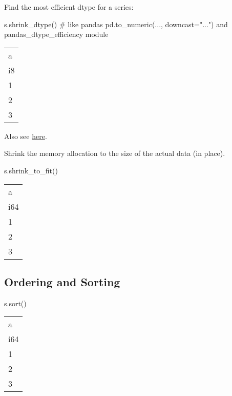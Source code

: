 \documentclass[
  letterpaper,
  DIV=11,
  numbers=noendperiod]{scrartcl}
\newenvironment{Shaded}{\begin{snugshade}}{\end{snugshade}}
\newcommand{\CommentTok}[1]{\textcolor[rgb]{0.37,0.37,0.37}{#1}}
\newcommand{\NormalTok}[1]{\textcolor[rgb]{0.00,0.23,0.31}{#1}}
\begin{document}
Find the most efficient dtype for a series:

\begin{Shaded}
\begin{Highlighting}[]
\NormalTok{s.shrink\_dtype() }\CommentTok{\# like pandas pd.to\_numeric(..., downcast="...") and pandas\_dtype\_efficiency module}
\end{Highlighting}
\end{Shaded}

\begin{longtable}[]{@{}l@{}}
\toprule()
a \\
i8 \\
\midrule()
\endhead
1 \\
2 \\
3 \\
\bottomrule()
\end{longtable}

Also see
\href{http://braaannigan.github.io/software/2022/10/31/polars-dtype-diet.html}{here}.

Shrink the memory allocation to the size of the actual data (in place).

\begin{Shaded}
\begin{Highlighting}[]
\NormalTok{s.shrink\_to\_fit() }
\end{Highlighting}
\end{Shaded}

\begin{longtable}[]{@{}l@{}}
\toprule()
a \\
i64 \\
\midrule()
\endhead
1 \\
2 \\
3 \\
\bottomrule()
\end{longtable}

\hypertarget{ordering-and-sorting}{%
\subsection{Ordering and Sorting}\label{ordering-and-sorting}}

\begin{Shaded}
\begin{Highlighting}[]
\NormalTok{s.sort()}
\end{Highlighting}
\end{Shaded}

\begin{longtable}[]{@{}l@{}}
\toprule()
a \\
i64 \\
\midrule()
\endhead
1 \\
2 \\
3 \\
\bottomrule()
\end{longtable}
\end{document}
